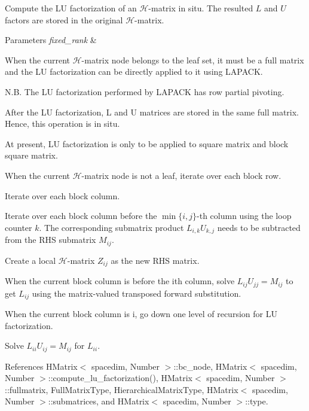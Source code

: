 Compute the LU factorization of an $\mathcal{H}$-\/matrix in situ. The resulted $L$ and $U$ factors are stored in the original $\mathcal{H}$-\/matrix.


\begin{DoxyParams}{Parameters}
{\em fixed\+\_\+rank} & \\
\hline
\end{DoxyParams}
When the current $\mathcal{H}$-\/matrix node belongs to the leaf set, it must be a full matrix and the LU factorization can be directly applied to it using L\+A\+P\+A\+CK.

N.\+B. The LU factorization performed by L\+A\+P\+A\+CK has row partial pivoting.

After the LU factorization, L and U matrices are stored in the same full matrix. Hence, this operation is in situ.

At present, LU factorization is only to be applied to square matrix and block square matrix.

When the current $\mathcal{H}$-\/matrix node is not a leaf, iterate over each block row.

Iterate over each block column.

Iterate over each block column before the $\min\{i, j\}$-\/th column using the loop counter $k$. The corresponding submatrix product $L_{i,k}U_{k,j}$ needs to be subtracted from the R\+HS submatrix $M_{ij}$.

Create a local $\mathcal{H}$-\/matrix $Z_{ij}$ as the new R\+HS matrix.

When the current block column is before the i\textquotesingle{}th column, solve $L_{ij} U_{jj}=M_{ij}$ to get $L_{ij}$ using the matrix-\/valued transposed forward substitution.

When the current block column is i, go down one level of recursion for LU factorization.

Solve $L_{ii}U_{ij}=M_{ij}$ for $L_{ii}$.

References H\+Matrix$<$ spacedim, Number $>$\+::bc\+\_\+node, H\+Matrix$<$ spacedim, Number $>$\+::compute\+\_\+lu\+\_\+factorization(), H\+Matrix$<$ spacedim, Number $>$\+::fullmatrix, Full\+Matrix\+Type, Hierarchical\+Matrix\+Type, H\+Matrix$<$ spacedim, Number $>$\+::submatrices, and H\+Matrix$<$ spacedim, Number $>$\+::type.

\mbox{\label{classHMatrix_af6fd60090b0de7bdea52fc84ddeb22c3}} 
